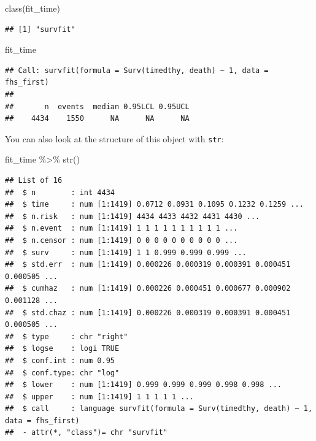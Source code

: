 \documentclass[
]{book}
\newenvironment{Shaded}{\begin{snugshade}}{\end{snugshade}}
\newcommand{\FunctionTok}[1]{\textcolor[rgb]{0.00,0.00,0.00}{#1}}
\newcommand{\NormalTok}[1]{#1}
\newcommand{\SpecialCharTok}[1]{\textcolor[rgb]{0.00,0.00,0.00}{#1}}
\begin{document}
\begin{Shaded}
\begin{Highlighting}[]
\FunctionTok{class}\NormalTok{(fit\_time)}
\end{Highlighting}
\end{Shaded}

\begin{verbatim}
## [1] "survfit"
\end{verbatim}

\begin{Shaded}
\begin{Highlighting}[]
\NormalTok{fit\_time}
\end{Highlighting}
\end{Shaded}

\begin{verbatim}
## Call: survfit(formula = Surv(timedthy, death) ~ 1, data = fhs_first)
## 
##       n  events  median 0.95LCL 0.95UCL 
##    4434    1550      NA      NA      NA
\end{verbatim}

You can also look at the structure of this object with \texttt{str}:

\begin{Shaded}
\begin{Highlighting}[]
\NormalTok{fit\_time }\SpecialCharTok{\%\textgreater{}\%} 
  \FunctionTok{str}\NormalTok{() }
\end{Highlighting}
\end{Shaded}

\begin{verbatim}
## List of 16
##  $ n        : int 4434
##  $ time     : num [1:1419] 0.0712 0.0931 0.1095 0.1232 0.1259 ...
##  $ n.risk   : num [1:1419] 4434 4433 4432 4431 4430 ...
##  $ n.event  : num [1:1419] 1 1 1 1 1 1 1 1 1 1 ...
##  $ n.censor : num [1:1419] 0 0 0 0 0 0 0 0 0 0 ...
##  $ surv     : num [1:1419] 1 1 0.999 0.999 0.999 ...
##  $ std.err  : num [1:1419] 0.000226 0.000319 0.000391 0.000451 0.000505 ...
##  $ cumhaz   : num [1:1419] 0.000226 0.000451 0.000677 0.000902 0.001128 ...
##  $ std.chaz : num [1:1419] 0.000226 0.000319 0.000391 0.000451 0.000505 ...
##  $ type     : chr "right"
##  $ logse    : logi TRUE
##  $ conf.int : num 0.95
##  $ conf.type: chr "log"
##  $ lower    : num [1:1419] 0.999 0.999 0.999 0.998 0.998 ...
##  $ upper    : num [1:1419] 1 1 1 1 1 ...
##  $ call     : language survfit(formula = Surv(timedthy, death) ~ 1, data = fhs_first)
##  - attr(*, "class")= chr "survfit"
\end{verbatim}
\end{document}
